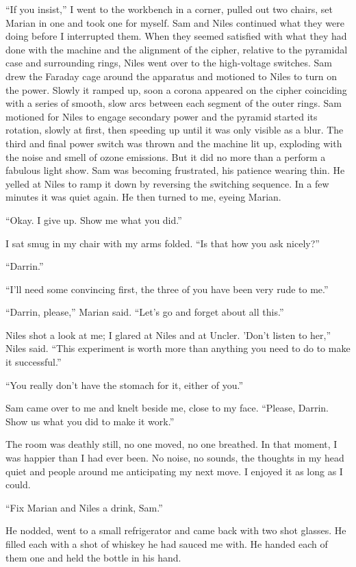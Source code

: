 ``If you insist,'' I went to the workbench in a corner, pulled out two
chairs, set Marian in one and took one for myself. Sam and Niles
continued what they were doing before I interrupted them. When they
seemed satisfied with what they had done with the machine and the
alignment of the cipher, relative to the pyramidal case and surrounding
rings, Niles went over to the high-voltage switches. Sam drew the
Faraday cage around the apparatus and motioned to Niles to turn on the
power. Slowly it ramped up, soon a corona appeared on the cipher
coinciding with a series of smooth, slow arcs between each segment of
the outer rings. Sam motioned for Niles to engage secondary power and
the pyramid started its rotation, slowly at first, then speeding up
until it was only visible as a blur. The third and final power switch
was thrown and the machine lit up, exploding with the noise and smell of
ozone emissions. But it did no more than a perform a fabulous light
show. Sam was becoming frustrated, his patience wearing thin. He yelled
at Niles to ramp it down by reversing the switching sequence. In a few
minutes it was quiet again. He then turned to me, eyeing Marian.

``Okay. I give up. Show me what you did.''

I sat smug in my chair with my arms folded. ``Is that how you ask
nicely?''

``Darrin.''

``I'll need some convincing first, the three of you have been very rude
to me.''

``Darrin, please,'' Marian said. ``Let's go and forget about all this.''

Niles shot a look at me; I glared at Niles and at Uncler. 'Don't listen
to her,'' Niles said. ``This experiment is worth more than anything you
need to do to make it successful.''

``You really don't have the stomach for it, either of you.''

Sam came over to me and knelt beside me, close to my face. ``Please,
Darrin. Show us what you did to make it work.''

The room was deathly still, no one moved, no one breathed. In that
moment, I was happier than I had ever been. No noise, no sounds, the
thoughts in my head quiet and people around me anticipating my next
move. I enjoyed it as long as I could.

``Fix Marian and Niles a drink, Sam.''

He nodded, went to a small refrigerator and came back with two shot
glasses. He filled each with a shot of whiskey he had sauced me with. He
handed each of them one and held the bottle in his hand.

